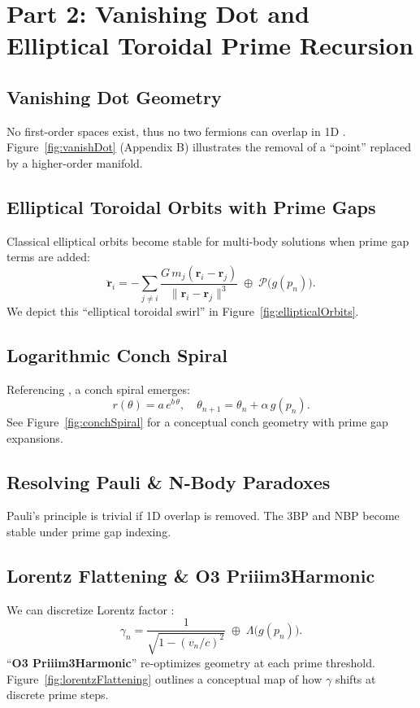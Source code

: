 \documentclass[11pt]{article}
\begin{document}
\section{Part 2: Vanishing Dot and Elliptical Toroidal Prime Recursion}
\label{part2}

\subsection{Vanishing Dot Geometry}
No first-order spaces exist, thus no two fermions can overlap in 1D \cite{Pauli1925}. Figure~\ref{fig:vanishDot} (Appendix B) illustrates the removal of a “point” replaced by a higher-order manifold.

\subsection{Elliptical Toroidal Orbits with Prime Gaps}
Classical elliptical orbits \cite{Newton1687} become stable for multi-body solutions when prime gap terms are added:
\[
\ddot{\mathbf{r}}_i 
= -\sum_{j \neq i} \frac{G\,m_j (\mathbf{r}_i - \mathbf{r}_j)}{\|\mathbf{r}_i - \mathbf{r}_j\|^3}
\;\oplus\;
\mathcal{P}\bigl(g(p_n)\bigr).
\]
We depict this “elliptical toroidal swirl” in Figure~\ref{fig:ellipticalOrbits}.

\subsection{Logarithmic Conch Spiral}
Referencing \cite{Hardy1979}, a conch spiral emerges:
\[
r(\theta) = a \, e^{b\,\theta}, \quad
\theta_{n+1} = \theta_n + \alpha\,g(p_n).
\]
See Figure~\ref{fig:conchSpiral} for a conceptual conch geometry with prime gap expansions.

\subsection{Resolving Pauli \& N-Body Paradoxes}
Pauli’s principle \cite{Pauli1925} is trivial if 1D overlap is removed. The 3BP \cite{Poincare1892} and NBP become stable under prime gap indexing.

\subsection{Lorentz Flattening \& O3 Priiim3Harmonic}
We can discretize Lorentz factor \cite{Lorentz1904}:
\[
\gamma_{n} 
= \frac{1}{\sqrt{1-(v_n/c)^2}} 
\;\oplus\; 
\Lambda\bigl(g(p_n)\bigr).
\]
“\textbf{O3 Priiim3Harmonic}” re-optimizes geometry at each prime threshold. Figure~\ref{fig:lorentzFlattening} outlines a conceptual map of how \(\gamma\) shifts at discrete prime steps.
\end{document}
